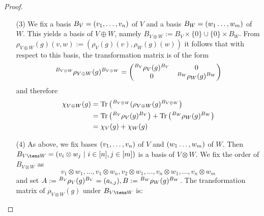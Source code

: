\documentclass[twoside = false,	%
		headsepline,		%
		parskip = true,
		]{scrbook}						%
\begin{document}
\begin{proof}
\begin{enumerate}
                \item [(3)]
                    We fix a basis $B_V = \left( v_1,\dots, v_n\right)$ of $V$ and a basis $B_W = \left( w_1\dots,w_m\right)$ of $W$. This yields a basis of $V \oplus W$, namely $B_{V \oplus W} := B_V \times \{0\} \cup \{0\} \times B_W$. %
                    From $\rho_{V\oplus W}(g)(v,w):=(\rho_V(g)(v),\rho_W(g)(w))$ it follows that with respect to this basis, the transformation matrix is of the form
                    \begin{align*}
                        \tensor[^{B_{V \oplus W}}]{\rho_{V\oplus W}(g)}{^{B_{V \oplus W}}} = \begin{pmatrix}
                        \tensor[^{B_V}]{\rho_V(g)}{^{B_V}} & 0 \\
                        0 & \tensor[^{B_W}]{\rho_W(g)}{^{B_W}}
                        \end{pmatrix}
                    \end{align*}
                    and therefore
                    \begin{equation*}
                    \begin{split}
                        \chi_{V\oplus W}(g) &= \Tr \round{ \tensor[ ^{B_{V \oplus W}} ] {(\rho_{V\oplus W}(g)} {^{B_{V \oplus W}}}} \\
                        &= \Tr \round{\tensor[^{B_V}]{\rho_V(g)}{^{B_V}}} + \Tr \round{\tensor[^{B_W}]{\rho_W(g)}{^{B_W}}} \\
                        &= \chi_V(g) + \chi_W(g)
                    \end{split}
                    \end{equation*}
                \item [(4)]
                    As above, we fix bases $\left( v_1,\dots, v_n\right)$ of $V$ and $\left( w_1\dots,w_m\right)$ of $W$. Then $B_{V \tens W} = \round{v_i\otimes w_j \ | \ i \in [n], j \in [m]}$ is a basis of $V \otimes W$. We fix the order of $B_{V\otimes W}$ as
                    \begin{equation*}
                        v_1\otimes w_1, \dots, v_1\otimes w_n, v_2\otimes w_1, \dots, v_n\otimes w_1, \dots, v_n\otimes w_m
                    \end{equation*}
                    and set $A := \tensor[^{B_V}]{\rho_V(g)}{^{B_V}} = (a_{i,j}), B: = \tensor[^{B_W}]{\rho_W(g)}{^{B_W}}$.
                    The transformation matrix of $\rho_{V\otimes W}(g)$ under $B_{V \tens W}$ is:

\end{enumerate}
\end{proof}
\end{document}
